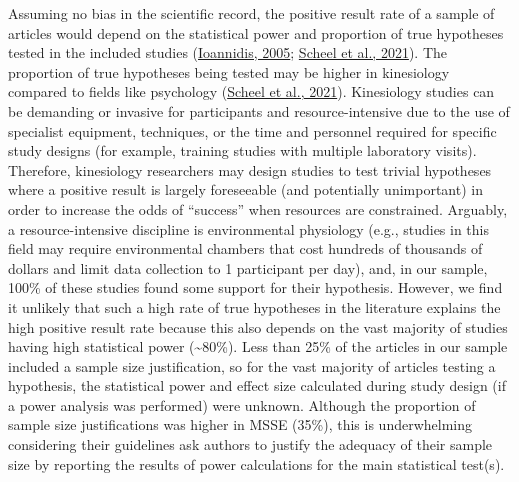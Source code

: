 \documentclass[]{cik}%
\begin{document}
Assuming no bias in the scientific record, the positive result rate of a
sample of articles would depend on the statistical power and proportion
of true hypotheses tested in the included studies
(\protect\hyperlink{ref-ioannidis_why_2005}{Ioannidis, 2005};
\protect\hyperlink{ref-scheel_excess_2020}{Scheel et al., 2021}). The
proportion of true hypotheses being tested may be higher in kinesiology
compared to fields like psychology
(\protect\hyperlink{ref-scheel_excess_2020}{Scheel et al., 2021}).
Kinesiology studies can be demanding or invasive for participants and
resource-intensive due to the use of specialist equipment, techniques,
or the time and personnel required for specific study designs (for
example, training studies with multiple laboratory visits). Therefore,
kinesiology researchers may design studies to test trivial hypotheses
where a positive result is largely foreseeable (and potentially
unimportant) in order to increase the odds of ``success'' when resources
are constrained. Arguably, a resource-intensive discipline is
environmental physiology (e.g., studies in this field may require
environmental chambers that cost hundreds of thousands of dollars and
limit data collection to 1 participant per day), and, in our sample,
100\% of these studies found some support for their hypothesis. However,
we find it unlikely that such a high rate of true hypotheses in the
literature explains the high positive result rate because this also
depends on the vast majority of studies having high statistical power
(\textasciitilde80\%). Less than 25\% of the articles in our sample
included a sample size justification, so for the vast majority of
articles testing a hypothesis, the statistical power and effect size
calculated during study design (if a power analysis was performed) were
unknown. Although the proportion of sample size justifications was
higher in MSSE (35\%), this is underwhelming considering their
guidelines ask authors to justify the adequacy of their sample size by
reporting the results of power calculations for the main statistical
test(s).
\end{document}
